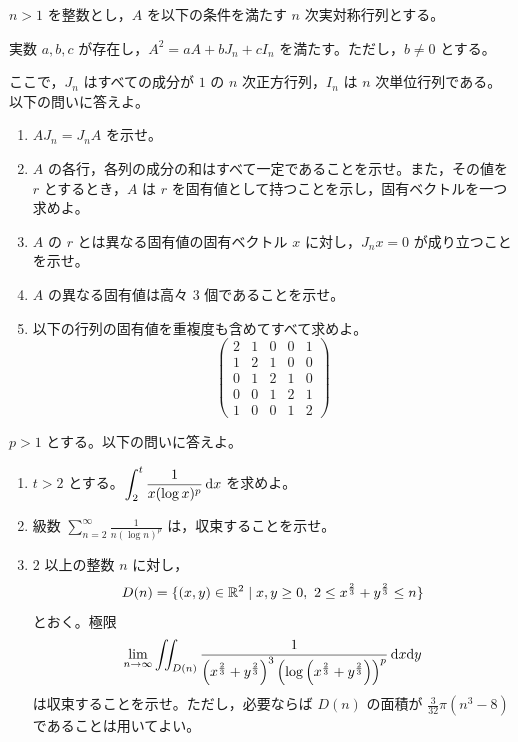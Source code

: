 


$n>1$ を整数とし，$A$ を以下の条件を満たす $n$ 次実対称行列とする。

実数 $a,b,c$ が存在し，$A^2=aA+bJ_n+cI_n$ を満たす。ただし，$b\ne0$ とする。

ここで，$J_n$ はすべての成分が $1$ の $n$ 次正方行列，$I_n$ は $n$ 次単位行列である。
以下の問いに答えよ。
\begin{enumerate}
  \item[(問1)] $AJ_n=J_nA$ を示せ。
  \item[(問2)] $A$ の各行，各列の成分の和はすべて一定であることを示せ。また，その値を $r$ とするとき，$A$ は $r$ を固有値として持つことを示し，固有ベクトルを一つ求めよ。
  \item[(問3)] $A$ の $r$ とは異なる固有値の固有ベクトル $x$ に対し，$J_nx=0$ が成り立つことを示せ。
  \item[(問4)] $A$ の異なる固有値は高々 $3$ 個であることを示せ。
  \item[(問5)] 以下の行列の固有値を重複度も含めてすべて求めよ。
  \[
  \begin{pmatrix}
  2&1&0&0&1\\
  1&2&1&0&0\\
  0&1&2&1&0\\
  0&0&1&2&1\\
  1&0&0&1&2
  \end{pmatrix}
  \]
\end{enumerate}
\wbend

$p>1$ とする。以下の問いに答えよ。
\begin{enumerate}
  \item[(問1)] $t>2$ とする。$\displaystyle\int_2^t\frac{1}{x(\log x)^p}\,\mathrm{d} x$ を求めよ。
  \item[(問2)] 級数 $\displaystyle\sum_{n=2}^{\infty}\frac{1}{n(\log n)^p}$ は，収束することを示せ。
  \item[(問3)] $2$ 以上の整数 $n$ に対し，
  \[
  D(n)=\{(x,y)\in\R^2\mid x,y\ge0,\ 2\le x^{\frac23}+y^{\frac23}\le n\}
  \]
  とおく。極限
  \[
  \lim_{n\to\infty}\iint_{D(n)}
  \frac{1}{\left(x^{\frac23}+y^{\frac23}\right)^3
  \left(\log\left(x^{\frac23}+y^{\frac23}\right)\right)^p}\,\mathrm{d} x\mathrm{d} y
  \]
  は収束することを示せ。ただし，必要ならば $D(n)$ の面積が $\displaystyle\frac{3}{32}\pi(n^3-8)$ であることは用いてよい。
\end{enumerate}
\wbend

